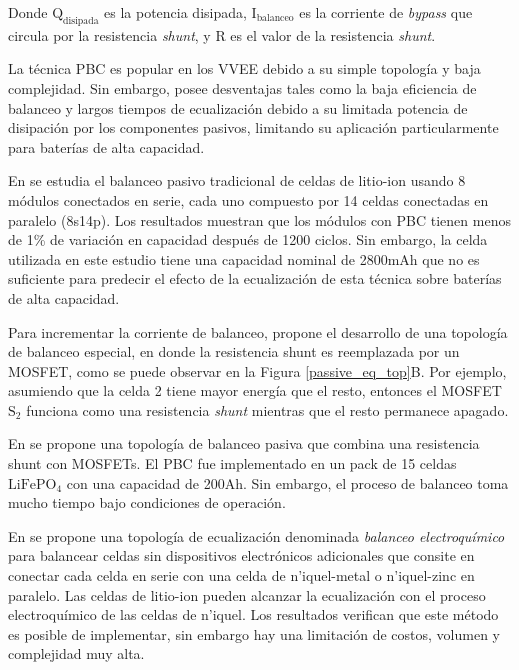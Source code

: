 \documentclass[10pt,a4paper]{article}
\begin{document}
Donde $\mathrm{Q_{disipada}}$ es la potencia disipada, $\mathrm{I_{balanceo}}$
es la corriente de \emph{bypass} que circula por la resistencia \emph{shunt}, y
R es el valor de la resistencia \emph{shunt}.

La t\'ecnica \acrshort{PBC} es popular en los \acrshort{VVEE} debido a su simple
topolog\'ia y baja complejidad. Sin embargo, posee desventajas tales como la
baja eficiencia de balanceo y largos tiempos de ecualizaci\'on debido a su
limitada potencia de disipaci\'on por los componentes pasivos, limitando su
aplicaci\'on particularmente para bater\'ias de alta capacidad.

En \cite{CAMPESTRINI2016142} se estudia el balanceo pasivo tradicional de celdas 
de litio-ion usando 8 m\'odulos conectados en serie, cada uno compuesto por 14 
celdas conectadas en paralelo (8s14p). Los resultados muestran que los m\'odulos 
con \acrshort{PBC} tienen menos de 1\% de variaci\'on en capacidad despu\'es de 
1200 ciclos. Sin embargo, la celda utilizada en este estudio tiene una capacidad
nominal de 2800mAh que no es suficiente para predecir el efecto de la
ecualizaci\'on de esta t\'ecnica sobre bater\'ias de alta capacidad.

Para incrementar la corriente de balanceo, \cite{XU20192948} propone el 
desarrollo de una topolog\'ia de balanceo especial, en donde la resistencia 
shunt es reemplazada por un MOSFET, como se puede observar en la Figura
\ref{passive_eq_top}B. Por ejemplo, asumiendo que la celda 2 tiene mayor
energ\'ia que el resto, entonces el MOSFET $\mathrm{S_2}$ funciona como una
resistencia \emph{shunt} mientras que el resto permanece apagado. 

En \cite{amin_et_al_bal} se propone una topolog\'ia de balanceo pasiva que 
combina una resistencia shunt con MOSFETs. El \acrshort{PBC} fue implementado 
en un pack de 15 celdas $\mathrm{LiFePO_4}$ con una capacidad de 200Ah. Sin 
embargo, el proceso de balanceo toma mucho tiempo bajo condiciones de 
operaci\'on.

En \cite{SCHMID201749} se propone una topolog\'ia de ecualizaci\'on denominada 
\emph{balanceo electroqu\'imico} para balancear celdas sin dispositivos 
electr\'onicos adicionales que consite en conectar cada celda en serie con una 
celda de n'iquel-metal o n'iquel-zinc en paralelo. Las celdas de litio-ion pueden 
alcanzar la ecualizaci\'on con el proceso electroqu\'imico de las celdas de 
n'iquel. Los resultados verifican que este m\'etodo es posible de implementar, 
sin embargo hay una limitaci\'on de costos, volumen y complejidad muy alta.
\end{document}
